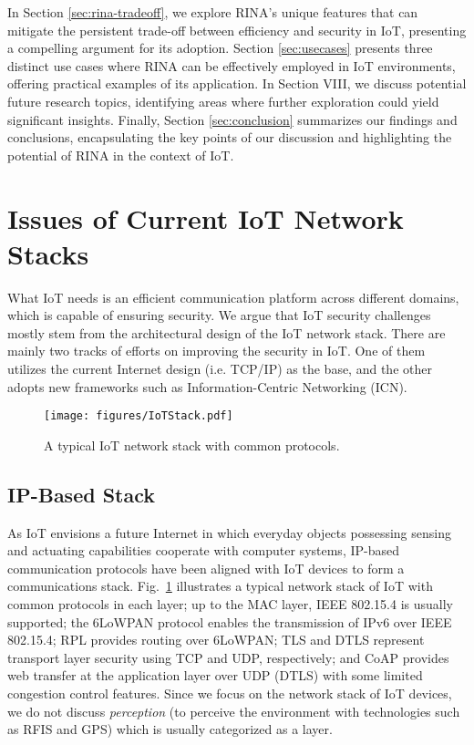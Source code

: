 \documentclass{ieeeaccess}
\begin{document}
In Section \ref{sec:rina-tradeoff}, we explore RINA’s unique features that can mitigate the persistent trade-off between efficiency and security in IoT, presenting a compelling argument for its adoption. Section \ref{sec:usecases} presents three distinct use cases where RINA can be effectively employed in IoT environments, offering practical examples of its application. In Section VIII, we discuss potential future research topics, identifying areas where further exploration could yield significant insights. Finally, Section \ref{sec:conclusion} summarizes our findings and conclusions, encapsulating the key points of our discussion and highlighting the potential of RINA in the context of IoT.

\section{Issues of Current IoT Network Stacks} \label{sec:iot}
What IoT needs is an efficient communication platform across different domains, which is capable of ensuring security. We argue that IoT security challenges mostly stem from the architectural design of the IoT network stack. There are mainly two tracks of efforts on improving the security in IoT. One of them utilizes the current Internet design (i.e. TCP/IP) as the base, and the other adopts new frameworks such as Information-Centric Networking (ICN).  



\begin{figure} 
	\centering
	\texttt{[image: figures/IoTStack.pdf]}
	\caption{A typical IoT network stack with common protocols.}
	\label{fig:IoTStack}
\end{figure}


\subsection{IP-Based Stack}
As IoT envisions a future Internet in which everyday objects possessing sensing and actuating capabilities cooperate with computer systems, IP-based communication protocols have been aligned with IoT devices to form a communications stack. 
Fig.~\ref{fig:IoTStack} illustrates a typical network stack of IoT with common protocols in each layer; up to the MAC layer, IEEE 802.15.4 \cite{6012487} is usually supported; the 6LoWPAN protocol \cite{rfc4919} enables the transmission of IPv6 over IEEE 802.15.4; RPL \cite{rfc6282} provides routing over 6LoWPAN; TLS \cite{rfc5246} and DTLS \cite{rfc6347} represent transport layer security using TCP and UDP, respectively; and CoAP \cite{rfc7252} provides web transfer at the application layer over UDP (DTLS) with some limited congestion control features. Since we focus on the network stack of IoT devices, we do not discuss \textit{perception} (to perceive the environment with technologies such as RFIS and GPS) which is usually categorized as a layer.
\end{document}
